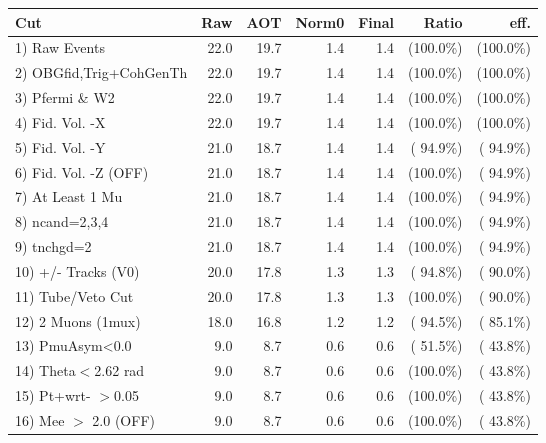  \begin{table}[h!]\centering
 \begin{tabular}{||l||r|r|r|r|r|r||}
 \hline
 \hline
 Cut & Raw & AOT & Norm0 & Final & Ratio & eff.       \\
 \hline
  1) Raw Events           &         22.0 &         19.7 &          1.4 &          1.4 & (100.0\%) & (100.0\%) \\
  2) OBGfid,Trig+CohGenTh &         22.0 &         19.7 &          1.4 &          1.4 & (100.0\%) & (100.0\%) \\
  3) Pfermi \& W2         &         22.0 &         19.7 &          1.4 &          1.4 & (100.0\%) & (100.0\%) \\
  4) Fid. Vol. -X         &         22.0 &         19.7 &          1.4 &          1.4 & (100.0\%) & (100.0\%) \\
  5) Fid. Vol. -Y         &         21.0 &         18.7 &          1.4 &          1.4 & ( 94.9\%) & ( 94.9\%) \\
  6) Fid. Vol. -Z (OFF)   &         21.0 &         18.7 &          1.4 &          1.4 & (100.0\%) & ( 94.9\%) \\
  7) At Least 1 Mu        &         21.0 &         18.7 &          1.4 &          1.4 & (100.0\%) & ( 94.9\%) \\
  8) ncand=2,3,4          &         21.0 &         18.7 &          1.4 &          1.4 & (100.0\%) & ( 94.9\%) \\
  9) tnchgd=2             &         21.0 &         18.7 &          1.4 &          1.4 & (100.0\%) & ( 94.9\%) \\
 10) +/- Tracks (V0)      &         20.0 &         17.8 &          1.3 &          1.3 & ( 94.8\%) & ( 90.0\%) \\
 11) Tube/Veto Cut        &         20.0 &         17.8 &          1.3 &          1.3 & (100.0\%) & ( 90.0\%) \\
 12) 2 Muons (1mux)       &         18.0 &         16.8 &          1.2 &          1.2 & ( 94.5\%) & ( 85.1\%) \\
 13) PmuAsym<0.0          &          9.0 &          8.7 &          0.6 &          0.6 & ( 51.5\%) & ( 43.8\%) \\
 14) Theta$<$2.62 rad     &          9.0 &          8.7 &          0.6 &          0.6 & (100.0\%) & ( 43.8\%) \\
 15) Pt+wrt- $>$0.05      &          9.0 &          8.7 &          0.6 &          0.6 & (100.0\%) & ( 43.8\%) \\
 16) Mee $>$ 2.0  (OFF)   &          9.0 &          8.7 &          0.6 &          0.6 & (100.0\%) & ( 43.8\%) \\

\end{tabular}
\end{table}
